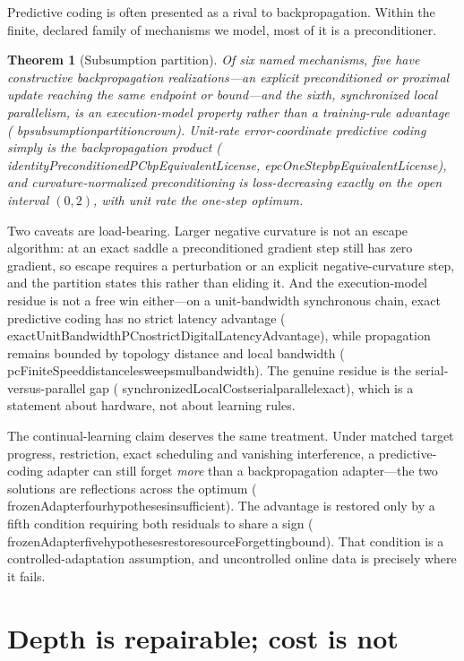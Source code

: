 \documentclass[11pt]{article}
\newtheorem{theorem}{Theorem}[section]
\newcommand{\leanname}[1]{{\scriptsize\ttfamily
  \def\_{\textunderscore\allowbreak}#1}}
\begin{document}
Predictive coding is often presented as a rival to backpropagation. Within the finite,
declared family of mechanisms we model, most of it is a preconditioner.

\begin{theorem}[Subsumption partition]
Of six named mechanisms, five have constructive backpropagation realizations---an explicit
preconditioned or proximal update reaching the same endpoint or bound---and the sixth,
synchronized local parallelism, is an \emph{execution-model} property rather than a
training-rule advantage (\leanname{bp\_subsumption\_partition\_crown}). Unit-rate
error-coordinate predictive coding simply is the backpropagation product
(\leanname{identityPreconditionedPC\_bpEquivalentLicense},
\leanname{epcOneStep\_bpEquivalentLicense}), and curvature-normalized preconditioning is
loss-decreasing exactly on the open interval $(0,2)$, with unit rate the one-step optimum.
\end{theorem}

Two caveats are load-bearing. Larger negative curvature is not an escape algorithm: at an
exact saddle a preconditioned gradient step still has zero gradient, so escape requires a
perturbation or an explicit negative-curvature step, and the partition states this rather
than eliding it. And the execution-model residue is not a free win either---on a
unit-bandwidth synchronous chain, exact predictive coding has no strict latency advantage
(\leanname{exactUnitBandwidthPC\_no\_strictDigitalLatencyAdvantage}), while propagation
remains bounded by topology distance and local bandwidth
(\leanname{pcFiniteSpeed\_distance\_le\_sweeps\_mul\_bandwidth}). The genuine residue is
the serial-versus-parallel gap (\leanname{synchronizedLocalCost\_serial\_parallel\_exact}),
which is a statement about hardware, not about learning rules.

The continual-learning claim deserves the same treatment. Under matched target progress,
restriction, exact scheduling and vanishing interference, a predictive-coding adapter can
still forget \emph{more} than a backpropagation adapter---the two solutions are reflections
across the optimum (\leanname{frozenAdapter\_four\_hypotheses\_insufficient}). The advantage
is restored only by a fifth condition requiring both residuals to share a sign
(\leanname{frozenAdapter\_five\_hypotheses\_restore\_sourceForgetting\_bound}). That
condition is a controlled-adaptation assumption, and uncontrolled online data is precisely
where it fails.

\section{Depth is repairable; cost is not}
\label{sec:depth}
\end{document}

